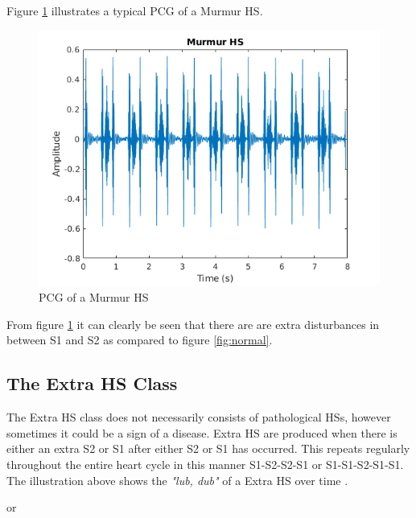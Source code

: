 \documentclass[10pt,twocolumn]{witseiepaper}
\begin{document}
Figure \ref{fig:murmur} illustrates a typical PCG of a Murmur HS.
\begin{figure}[h!]
    \centering
    \includegraphics[scale = 0.45]{./murmur.png}
    \caption{PCG of a Murmur HS}
    \label{fig:murmur}
\end{figure}{}

From figure \ref{fig:murmur} it can clearly be seen that there are are extra disturbances in between S1 and S2 as compared to figure \ref{fig:normal}.

\subsection*{The Extra HS Class}
\label{sec:extra}
The Extra HS class does not necessarily consists of pathological HSs, however sometimes it could be a sign of a disease. Extra HS are produced when there is either an extra S2 or S1 after either S2 or S1 has occurred. This repeats regularly throughout the entire heart cycle in this manner S1-S2-S2-S1 or S1-S1-S2-S1-S1.
The illustration above shows the \textit{"lub, dub"} of a Extra HS over time \cite{bentley}.


\hspace{3.5cm} or 

\end{document}
